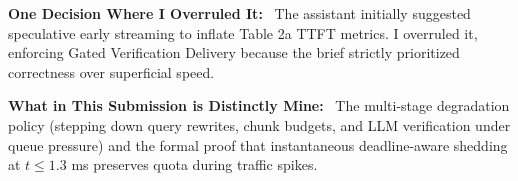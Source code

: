 \documentclass[10pt,a4paper]{article}
\newcommand{\subhead}[1]{\noindent\textbf{#1}\ }
\begin{document}
\subhead{One Decision Where I Overruled It:}
The assistant initially suggested speculative early streaming to inflate Table 2a TTFT metrics. I overruled it, enforcing Gated Verification Delivery because the brief strictly prioritized correctness over superficial speed.

\subhead{What in This Submission is Distinctly Mine:}
The multi-stage degradation policy (stepping down query rewrites, chunk budgets, and LLM verification under queue pressure) and the formal proof that instantaneous deadline-aware shedding at $t \le 1.3$ ms preserves quota during traffic spikes.
\end{document}
